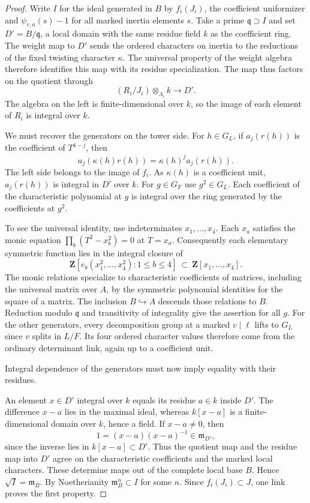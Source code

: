 \begin{proof}
Write \(I\) for the ideal generated in \(B\) by
\(f_i(J_i)\), the coefficient uniformizer and
\(\psi_{v,a}(s)-1\) for all marked inertia elements \(s\).
Take a prime \(\mathfrak q\supset I\) and set
\(D'=B/\mathfrak q\), a local domain with the same
residue field \(k\) as the coefficient ring.
The weight map to \(D'\) sends the ordered characters on
inertia to the reductions of the fixed twisting character
\(\kappa\). The universal property of the weight algebra
therefore identifies this map with its residue specialization.
The map thus factors on the quotient through
\[
  (R_i/J_i)\otimes_{\Lambda_i}k\longrightarrow D' .
\]
The algebra on the left is finite-dimensional over \(k\), so the image of each element of \(R_i\) is integral over \(k\).

We must recover the generators on the tower side. For \(h\in G_L\), if \(a_j(r(h))\) is the coefficient of
\(T^{4-j}\), then
\[
                 a_j(\kappa(h)r(h))=\kappa(h)^j a_j(r(h)).
\]
The left side belongs to the image of \(f_i\).
As \(\kappa(h)\) is a coefficient unit, \(a_j(r(h))\) is
integral in \(D'\) over \(k\). For \(g\in G_F\) use
\(g^2\in G_L\).
Each coefficient of the characteristic polynomial at \(g\)
is integral over the ring generated by the coefficients at
\(g^2\).

To see the universal identity, use indeterminates
\(x_1,\ldots,x_4\). Each \(x_a\) satisfies the monic
equation \(\prod_b(T^2-x_b^2)=0\) at \(T=x_a\).
Consequently each elementary symmetric function lies in the
integral closure of
\[
        \mathbf Z[e_b(x_1^2,\ldots,x_4^2):1\le b\le4]
            \ \subset\ \mathbf Z[x_1,\ldots,x_4].
\]
The monic relations specialize to characteristic coefficients
of matrices, including the universal matrix over \(A\), by
the symmetric polynomial identities for the square of a
matrix. The inclusion \(B\hookrightarrow A\) descends those
relations to \(B\). Reduction modulo \(\mathfrak q\) and
transitivity of integrality give the assertion for all \(g\).
For the other generators, every decomposition group at a
marked \(v\mid\ell\) lifts to \(G_L\) since \(v\) splits in
\(L/F\). Its four ordered character values therefore come
from the ordinary determinant link, again up to a coefficient unit.


Integral dependence of the generators must now imply equality with their residues.


An element \(x\in D'\) integral over \(k\) equals its
residue \(a\in k\) inside \(D'\). The difference \(x-a\) lies in the maximal ideal, whereas \(k[x-a]\) is a finite-dimensional domain over \(k\), hence a field. If \(x-a\ne0\), then
\[
 1=(x-a)(x-a)^{-1}\in\mathfrak m_{D'},
\]
since the inverse lies in \(k[x-a]\subset D'\). Thus the
quotient map and the residue map into \(D'\) agree on the
characteristic coefficients and the marked local characters.
These determine maps out of the complete local base \(B\).
Hence \(\sqrt I=\mathfrak m_B\). By Noetherianity
\(\mathfrak m_B^n\subset I\) for some \(n\). Since
\(f_i(J_i)\subset J\), one link proves the first property.

\end{proof}

